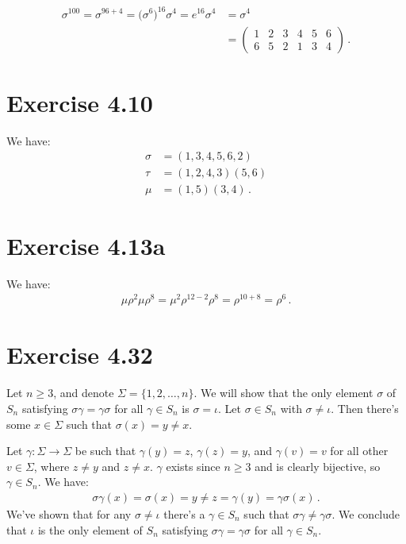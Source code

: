 \documentclass{article}
\begin{document}
\begin{align*}
    \sigma^{100} = \sigma^{96+4} = \bigl(\sigma^6\bigr)^{16}\sigma^4
    = e^{16} \sigma^4 &= \sigma^4 \\
    &= \begin{pmatrix}
        1 & 2 & 3 & 4 & 5 & 6 \\
        6 & 5 & 2 & 1 & 3 & 4
    \end{pmatrix} \,.
\end{align*}

\section*{Exercise 4.10}

We have:
\begin{align*}
    \sigma &= (1, 3, 4, 5, 6, 2) \\
    \tau &= (1, 2, 4, 3)(5, 6) \\
    \mu &= (1, 5)(3, 4) \,.
\end{align*}

\section*{Exercise 4.13a}

We have:
\begin{align*}
    \mu\rho^2\mu\rho^8 = 
    \mu^2\rho^{12-2}\rho^8
    = \rho^{10+8}
    = \rho^{6} \,.
\end{align*}

\section*{Exercise 4.32}

Let $n \geq 3$, and denote $\Sigma = \{1, 2, \dots, n\}$. We will show that
the only element $\sigma$
of $S_n$ satisfying
$\sigma\gamma = \gamma\sigma$
for all $\gamma \in S_n$
is $\sigma = \iota$.
Let $\sigma \in S_n$
with $\sigma \neq \iota$. Then there's some $x \in \Sigma$ such that
$\sigma(x) = y \neq x$.

Let $\gamma : \Sigma \to \Sigma$
be such that $\gamma(y) =z$, $\gamma(z) = y$, and $\gamma(v) = v$
for all other $v \in \Sigma$, where $z \neq y$ and $z \neq x$.
$\gamma$ exists since $n \geq 3$ and is clearly bijective, so $\gamma \in S_n$.
We have:
\begin{align*}
    \sigma\gamma(x) = \sigma(x) = y \neq z = \gamma(y) = \gamma\sigma(x) \,.
\end{align*}
We've shown that for any $\sigma \neq \iota$ there's a $\gamma \in S_n$ such that
$\sigma\gamma \neq \gamma\sigma$.
We conclude that $\iota$ is the only element of $S_n$ satisfying
$\sigma\gamma = \gamma\sigma$ for all $\gamma \in S_n$.
\end{document}
